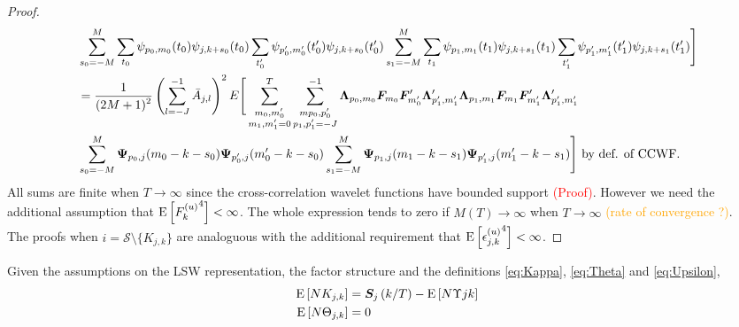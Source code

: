 \documentclass[main_document.tex]{subfiles}
\begin{document}
\begin{proof}
\begin{align*}
	 & \sum_{s_0=-M}^{M} \sum_{t_0} \wavelet{p_0}{m_0}{t_0}\wavelet{j}{k+s_0}{t_0}\sum_{t_0'}\wavelet{p_0'}{m_0'}{t_0'}\wavelet{j}{k+s_0}{t_0'}\sum_{s_1=-M}^{M}\sum_{t_1}\wavelet{p_1}{m_1}{t_1}\wavelet{j}{k+s_1}{t_1}\sum_{t_1'}\wavelet{p_1'}{m_1'}{t_1'}\wavelet{j}{k+s_1}{t_1'} \Bigg ]\\
  	&= \frac{\displaystyle 1}{\displaystyle (2M+1)^2} \left(\scalesum{l}\invA{j}{l} \right)^{2} E \Bigg [ \sum_{\substack{m_0,m_0' \\ m_1,m_1'=0}}^{T}\sum_{\substack{mp_0,p_0' \\ p_1,p_1'=-J}}^{-1}\loadings{p_0}{m_0}\factors{m_0}\factors{m_0'}' \loadings{p_1'}{m_1'}'\loadings{p_1}{m_1}\factors{m_1}\factors{m_1'}' \loadings{p_1'}{m_1'}' \\
	 & \sum_{s_0=-M}^{M} \CCwavelet{p_0}{j}{m_0 - k - s_0} \CCwavelet{p_0'}{j}{m_0' - k - s_0} \sum_{s_1=-M}^{M}\CCwavelet{p_1}{j}{m_1 - k - s_1}\CCwavelet{p_1'}{j}{m_1' - k - s_1} \Bigg ] \text{ by def. of CCWF.}
	\end{align*}
All sums are finite when $T \to \infty$ since the cross-correlation wavelet functions have bounded support \textcolor{red}{(Proof)}. However we need the additional assumption that $\mathrm{E}\left[{F_{k}^{(u)}}^{4}\right] < \infty$. The whole expression tends to zero if $M(T) \to \infty$ when $T \to \infty$ \textcolor{orange}{(rate of convergence ?)}. \\
The proofs when $i = \mathcal{S} \setminus \{K_{j,k}\} $ are analoguous with the additional requirement that $\mathrm{E}\left[{\epsilon_{j,k}^{(u)}}^{4}\right] < \infty$. 
\end{proof}
	\begin{theorem} \label{thm:CEWS_Components}
		Given the assumptions on the LSW representation, the factor structure and the definitions \eqref{eq:Kappa}, \eqref{eq:Theta} and \eqref{eq:Upsilon},
		\begin{align*}
			\mathrm{E}\left[N K_{j,k}\right] &= \bm{S}_{j}\left(k/T\right) - \mathrm{E}\left[N\Upsilon{j}{k}\right] \\
			\mathrm{E}\left[N \Theta_{j,k}\right] &= 0
		\end{align*}
	\end{theorem}
\end{document}

